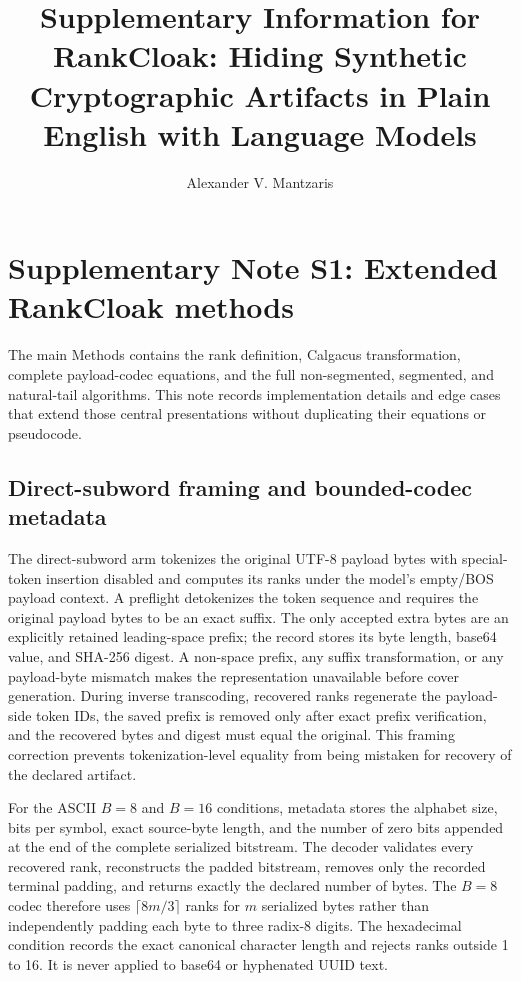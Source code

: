 \documentclass[fleqn,10pt]{wlscirep}
\title{Supplementary Information for\\RankCloak: Hiding Synthetic Cryptographic Artifacts in Plain English with Language Models}
\author[1,*]{Alexander V. Mantzaris}
\affil[1]{School of Data, Mathematical, and Statistical Sciences, University of Central Florida, Orlando, FL, United States of America}
\affil[*]{Correspondence: alexander.mantzaris@ucf.edu}
\begin{document}
\maketitle
\linenumbers
\raggedbottom

\section*{Supplementary Note S1: Extended RankCloak methods}\label{si:s1}

The main Methods contains the rank definition, Calgacus transformation, complete payload-codec equations, and the full non-segmented, segmented, and natural-tail algorithms. This note records implementation details and edge cases that extend those central presentations without duplicating their equations or pseudocode.

\subsection*{Direct-subword framing and bounded-codec metadata}

The direct-subword arm tokenizes the original UTF-8 payload bytes with special-token insertion disabled and computes its ranks under the model's empty/BOS payload context. A preflight detokenizes the token sequence and requires the original payload bytes to be an exact suffix. The only accepted extra bytes are an explicitly retained leading-space prefix; the record stores its byte length, base64 value, and SHA-256 digest. A non-space prefix, any suffix transformation, or any payload-byte mismatch makes the representation unavailable before cover generation. During inverse transcoding, recovered ranks regenerate the payload-side token IDs, the saved prefix is removed only after exact prefix verification, and the recovered bytes and digest must equal the original. This framing correction prevents tokenization-level equality from being mistaken for recovery of the declared artifact.

For the ASCII \(B=8\) and \(B=16\) conditions, metadata stores the alphabet size, bits per symbol, exact source-byte length, and the number of zero bits appended at the end of the complete serialized bitstream. The decoder validates every recovered rank, reconstructs the padded bitstream, removes only the recorded terminal padding, and returns exactly the declared number of bytes. The \(B=8\) codec therefore uses \(\lceil8m/3\rceil\) ranks for \(m\) serialized bytes rather than independently padding each byte to three radix-8 digits. The hexadecimal condition records the exact canonical character length and rejects ranks outside 1 to 16. It is never applied to base64 or hyphenated UUID text.
\end{document}
